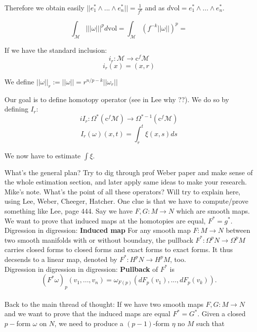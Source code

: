 \documentclass[licencjacka]{pracamgr}
\begin{document}
\normalsize

Therefore we obtain easily $||e_1^{\ast} \wedge ... \wedge e_n^\ast || =
\frac{1}{f^k}$ and as $d\mathrm{vol} = e_1^{\ast} \wedge ... \wedge e_n^\ast $.



\[
    \int_{\mathcal{M}} ||| \omega |||^p d\mathrm{vol} = 
    \int_{\mathcal{M}}  (f^{-k}|| \omega ||)^p =  
\]

If we have the standard inclusion:
\[
    i_r: \mathcal{M} \rightarrow \mathrm{c}^f \mathcal{M}
\]
\[
    i_r(x) = (x, r)
\]

We define $|| \omega ||_r := || \omega || = r^{n/p - k} ||\omega_r||$

Our goal is to define homotopy operator (see in Lee why ??). We do so by
defining $I_r$:
\[
  i I_r: \Omega^\ast( \mathrm{c}^f \mathcal{M} ) \rightarrow
  \Omega^{\ast-1}(\mathrm{c}^f \mathcal{M} ) 
\]
\[
    I_r(\omega)(x, t) = \int_r^t \xi(x, s) ds
\]

We now have to estimate $\int \xi$.

What's the general plan? Try to dig through prof Weber paper and make
sense of the whole estimation section, and later apply same ideas to
make your research. \\ 

\scriptsize
Mike's note. What's the point of all these operators? Will try to
explain here, using Lee, Weber, Cheeger, Hatcher.  One clue is that we
have to compute/prove something like Lee, page 444.  Say we have $F,G:
M \rightarrow N$ which are smooth maps. We want to prove that induced
maps at the homotopies are equal, $F^\ast = g^\ast$. \\

Digression in digression: \textbf{Induced map} For any smooth map $F:
M \rightarrow N$ between two smooth manifolds with or without
boundary, the pullback $F^\ast: \Omega^p N \rightarrow \Omega^p M$
carries closed forms to closed forms and exact forms to exact
forms. It thus decsends to a linear map, denoted by $F^\ast: H^p N
\rightarrow H^p M$, too. \\

Digression in digression in digression: \textbf{Pullback} of $F^\ast$ is
\[
    (F^\ast \omega)_p(v_1, ..., v_n) =
        \omega_{F(p)}(dF_p(v_1), ..., dF_p(v_k)).
\] \\

Back to the main thread of thought: If we have two smooth maps $F, G:
M \rightarrow N$ and we want to prove that the induced maps are equal
$F^\ast = G^\ast$. Given a closed $p-$form $\omega$ on $N$, we need to
produce a $(p-1)$-form $\eta$ no $M$ such that
\end{document}
